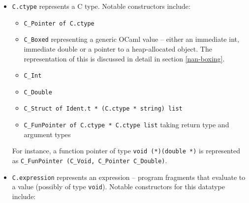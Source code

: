 \documentclass[12pt,a4paper,twoside,openright]{report}
\begin{document}
\begin{itemize}
  \item
    \lstinline!C.ctype! represents a C type. Notable constructors include:

    \begin{itemize}
        \item \lstinline!C_Pointer of C.ctype!
        \item \lstinline!C_Boxed! representing a generic OCaml value -- either
            an immediate int, immediate double or a pointer to a heap-allocated
            object. The representation of this is discussed in detail in
            section \ref{nan-boxing}.
        \item \lstinline!C_Int!
        \item \lstinline!C_Double!
        \item \lstinline!C_Struct of Ident.t * (C.ctype * string) list!
        \item \lstinline!C_FunPointer of C.ctype * C.ctype list! taking return
            type and argument types
    \end{itemize}

    For instance, a function pointer of type \lstinline!void (*)(double *)! is
    represented as \lstinline!C_FunPointer (C_Void, C_Pointer C_Double)!.
  \item
    \lstinline!C.expression! represents an expression -- program fragments that
    evaluate to a value (possibly of type \lstinline!void!). Notable
    constructors for this datatype include:


\end{itemize}
\end{document}
